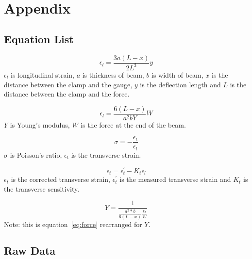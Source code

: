 \documentclass[]{article}
\begin{document}
\newpage
\section{Appendix}
\subsection{Equation List} 

\begin{equation}\label{eq:longitudinal}
    \epsilon_l = \frac{3a(L-x)}{2L^3}y
\end{equation}
$\epsilon_l$ is longitudinal strain, $a$ is thickness of beam, $b$ is width
of beam, $x$ is the distance between the clamp and the gauge, $y$ is the
deflection length and $L$ is the distance between the clamp and the force.

\begin{equation}\label{eq:force}
    \epsilon_l = \frac{6(L-x)}{a^2bY}W
\end{equation}
$Y$ is Young's modulus, $W$ is the force at the end of the beam.


\begin{equation}\label{eq:poisson}
    \sigma = -\frac{\epsilon_t}{\epsilon_l}
\end{equation}
$\sigma$ is Poisson's ratio, $\epsilon_t$ is the transverse strain.

\begin{equation}\label{eq:transverse}
    \epsilon_t = \epsilon_t^{'} - K_t\epsilon_l
\end{equation}
$\epsilon_t$ is the corrected transverse strain, $\epsilon_t^{'}$ is the measured
transverse strain and $K_t$ is the transverse sensitivity.

\begin{equation}\label{eq:young}
    Y = \frac{1}{\frac{a^2 * b}{6(L-x)}\frac{\epsilon_l}{W}}
\end{equation}
Note: this is equation~\ref{eq:force} rearranged for $Y$.

\subsection{Raw Data}
\end{document}
